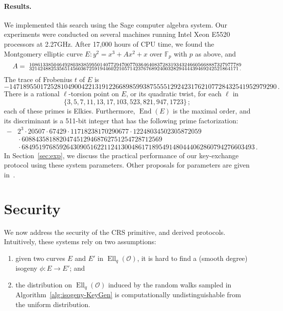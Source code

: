 \documentclass{llncs}
\newcommand{\F}{\mathbb{F}}
\renewcommand{\O}{\mathcal{O}}
\DeclareMathOperator{\End}{End}
\DeclareMathOperator{\Ell}{Ell}
\begin{document}
\paragraph{Results.}
We implemented this search using the Sage computer algebra system.
Our experiments were conducted on several machines running
Intel Xeon E5520 processors at 2.27GHz.
After 17,000 hours of CPU time, we found the Montgomery elliptic curve 
$
	E : y^2 = x^3 + A x^2 + x
$
over $\F_p$ with $p$ as above, and
\[
  A =\
  \begin{subarray}{l}
    108613385046492803838599501407729470077036464083728319343246605668887327977789 \\
    32142488253565145603672591944602210571423767689240032829444439469242521864171\,.
  \end{subarray}
\]
The trace of Frobenius $t$ of $E$ is
\[
    \scriptstyle -147189550172528104900422131912266898599387555512924231762107728432541952979290\,.
\]
There is a rational $\ell$-torsion point 
on $E$, or its quadratic twist, for each $\ell$ in
\[
  \{3, 5, 7, 11, 13, 17, 103, 523, 821, 947, 1723\}
  \,;
\]
each of these primes is Elkies.
Furthermore, $\End(E)$ is the maximal order, and its discriminant is
a 511-bit integer that has the following prime factorization:
\[
\begin{aligned}
    \scriptstyle -
    & \scriptstyle 2^3 \cdot 20507 \cdot 67429 \cdot 11718238170290677 \cdot 12248034502305872059 \\
    & \scriptstyle {}\cdot 60884358188204745129468762751254728712569\\
    & \scriptstyle {}\cdot 68495197685926430905162211241300486171895491480444062860794276603493\,.
\end{aligned}
\]
In Section~\ref{sec:exp}, we discuss the practical performance
of our key-exchange protocol using these system parameters.
Other proposals for parameters are given in~\cite{memoire}.

\section{Security}
\label{sec:sec}

We now address the security of the CRS primitive, and derived
protocols. Intuitively, these systems rely on two assumptions:
\begin{enumerate}
    \item given two curves $E$ and $E'$ in $\Ell_q(\O)$, it is hard to
        find a (smooth degree) isogeny $ϕ:E→E'$; and
    \item the distribution on $\Ell_q(\O)$ induced by the random walks
        sampled in Algorithm~\ref{alg:isogeny-KeyGen} is computationally
        undistinguishable from the uniform distribution.
\end{enumerate}
\end{document}
